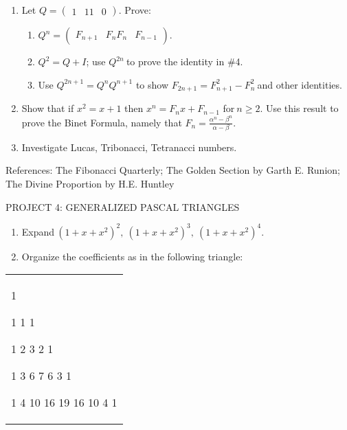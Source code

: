 \documentclass[10pt,letter]{article}
\renewenvironment{quote}
  {\begin{tabular}{|p{13cm}}}
  {\end{tabular}}
\begin{document}
\begin{enumerate}
\def\labelenumi{\arabic{enumi}.}

\item
  Let \(Q =

\begin{pmatrix}
  1 & 1 
  1 & 0 
  \end{pmatrix}
\). Prove:

\begin{enumerate}
  \def\labelenumii{\alph{enumii}.}

  \item
    \(Q^{n} =

\begin{pmatrix}
    F_{n + 1} & F_{n} 
    F_{n} & F_{n - 1} 
    \end{pmatrix}
\).
  \item
    \(Q^{2} = Q + I\); use \(Q^{2n}\ \)to prove the identity in \#4.
  \item
    Use \(Q^{2n + 1} = Q^{n}Q^{n + 1}\) to show
    \(F_{2n + 1} = F_{n + 1}^{2} - F_{n}^{2}\ \)and other identities.
  
\end{enumerate}
\item
  Show that if \(x^{2} = x + 1\) then \(x^{n} = F_{n}x + F_{n - 1}\)
  for\(\ n \geq 2\). Use this result to prove the Binet Formula, namely
  that \(F_{n} = \frac{\alpha^{n} - \beta^{n}}{\alpha - \beta}\).
\item
  Investigate Lucas, Tribonacci, Tetranacci numbers.

\end{enumerate}

References: The Fibonacci Quarterly; The Golden Section by Garth E.
Runion; The Divine Proportion by H.E. Huntley

PROJECT 4: GENERALIZED PASCAL TRIANGLES

\begin{enumerate}
\def\labelenumi{\arabic{enumi}.}

\item
  Expand\({\ \left( 1 + x + x^{2} \right)}^{2},\ \left( 1 + x + x^{2} \right)^{3},\ \left( 1 + x + x^{2} \right)^{4}\).
\item
  Organize the coefficients as in the following triangle:

\end{enumerate}

\begin{quote}
1

1 1 1

1 2 3 2 1

1 3 6 7 6 3 1

1 4 10 16 19 16 10 4 1

\end{quote}
\end{document}
